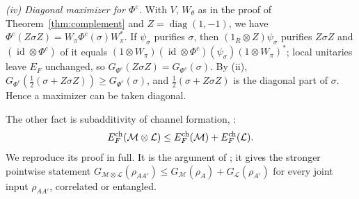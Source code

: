 \documentclass[11pt]{article}
\begin{document}
\emph{(iv) Diagonal maximizer for $\Phi^c$.} With $V$, $W_\theta$ as in the proof of Theorem~\ref{thm:complement} and $Z=\operatorname{diag}(1,-1)$, we have $\Phi^c(Z\sigma Z)=W_\pi\Phi^c(\sigma)W_\pi^*$. If $\psi_\sigma$ purifies $\sigma$, then $(1_R\otimes Z)\psi_\sigma$ purifies $Z\sigma Z$ and $(\operatorname{id}\otimes\Phi^c)$ of it equals $(1\otimes W_\pi)(\operatorname{id}\otimes\Phi^c)(\psi_\sigma)(1\otimes W_\pi)^*$; local unitaries leave $E_F$ unchanged, so $G_{\Phi^c}(Z\sigma Z)=G_{\Phi^c}(\sigma)$. By (ii), $G_{\Phi^c}(\tfrac12(\sigma+Z\sigma Z))\ge G_{\Phi^c}(\sigma)$, and $\tfrac12(\sigma+Z\sigma Z)$ is the diagonal part of $\sigma$. Hence a maximizer can be taken diagonal.

The other fact is subadditivity of channel formation,
\cite[Appendix~C, Lemma~C.2]{tang}:
\begin{equation}\label{eq:chsub}
 E_F^{\rm ch}(\mathcal M\otimes\mathcal L)
 \le E_F^{\rm ch}(\mathcal M)+E_F^{\rm ch}(\mathcal L).
\end{equation}
We reproduce its proof in full. It is the argument of \cite[Lemma~C.2]{tang}; it gives the stronger pointwise statement
$G_{\mathcal M\otimes\mathcal L}(\rho_{AA'})\le G_{\mathcal M}(\rho_A)+G_{\mathcal L}(\rho_{A'})$ for every joint input $\rho_{AA'}$, correlated or entangled.
\end{document}
